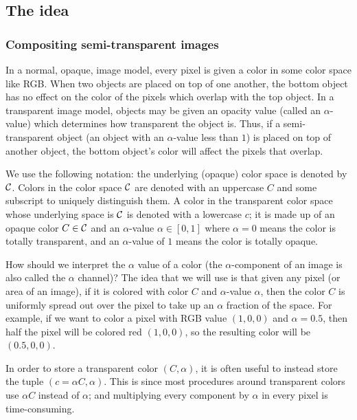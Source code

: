 \subsection{The idea}

\subsubsection{Compositing semi-transparent images}

In a normal, opaque, image model, every pixel is given a color in some color space like RGB.
When two objects are placed on top of one another, the bottom object has no effect on the color of the pixels
which overlap with the top object.
In a transparent image model, objects may be given an opacity value (called an $\alpha$-value) which determines
how transparent the object is.
Thus, if a semi-transparent object (an object with an $\alpha$-value less than $1$) is placed on top of another
object, the bottom object's color will affect the pixels that overlap.

We use the following notation: the underlying (opaque) color space is denoted by ${\cal C}$.
Colors in the color space ${\cal C}$ are denoted with an uppercase $C$ and some subscript to uniquely distinguish
them.
A color in the transparent color space whose underlying space is ${\cal C}$ is denoted with a lowercase $c$;
it is made up of an opaque color $C\in{\cal C}$ and an $\alpha$-value $\alpha\in[0,1]$ where $\alpha=0$ means the
color is totally transparent, and an $\alpha$-value of $1$ means the color is totally opaque.

How should we interpret the $\alpha$ value of a color (the $\alpha$-component of an image is also called the
$\alpha$ channel)?
The idea that we will use is that given any pixel (or area of an image), if it is colored with color
$C$ and $\alpha$-value $\alpha$, then the color $C$ is uniformly spread out over the pixel to take up an
$\alpha$ fraction of the space.
For example, if we want to color a pixel with RGB value $(1,0,0)$ and $\alpha=0.5$, then half the pixel will
be colored red $(1,0,0)$, so the resulting color will be $(0.5,0,0)$.

In order to store a transparent color $(C,\alpha)$, it is often useful to instead store the tuple
$(c=\alpha C,\alpha)$.
This is since most procedures around transparent colors use $\alpha C$ instead of $\alpha$; and multiplying
every component by $\alpha$ in every pixel is time-consuming.

